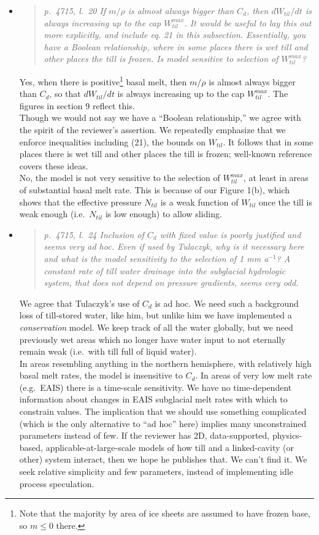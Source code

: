 \documentclass[11pt,reqno]{amsart}
\newcommand{\reply}[2]{
\medskip\medskip
\item  \begin{quote}
\emph{#1}
\end{quote}

\medskip
\noindent #2}
\begin{document}
\begin{itemize}
\reply{p.~4715, l.~20 If $m/\rho$ is almost always bigger than $C_d$, then $dW_{til}/dt$ is always increasing up to the cap $W_{til}^{max}$. It would be useful to lay this out more explicitly, and include eq. 21 in this subsection. Essentially, you have a Boolean relationship, where in some places there is wet till and other places the till is frozen. Is model sensitive to selection of $W_{til}^{max}$?}
{Yes, when there is positive\footnote{Note that the majority by area of ice sheets are assumed to have frozen base, so $m\le 0$ there.} basal melt, then $m/\rho$ is almost always bigger than $C_d$, so that $dW_{til}/dt$ is always increasing up to the cap $W_{til}^{max}$.  The figures in section 9 reflect this. \\
\indent Though we would not say we have a ``Boolean relationship,'' we agree with the spirit of the reviewer's assertion.  We repeatedly emphasize that we enforce inequalities including (21), the bounds on $W_{til}$.  It follows that in some places there is wet till and other places the till is frozen; well-known reference \cite{BBssasliding} covers these ideas.\\
\indent No, the model is not very sensitive to the selection of $W_{til}^{max}$, at least in areas of substantial basal melt rate.  This is because of our Figure 1(b), which shows that the effective pressure $N_{til}$ is a weak function of $W_{til}$ once the till is weak enough (i.e.~$N_{til}$ is low enough) to allow sliding.}

\reply{p.~4715, l.~24 Inclusion of $C_d$ with fixed value is poorly justified and seems very ad hoc.  Even if used by Tulaczyk, why is it necessary here and what is the model sensitivity to the selection of 1 mm a$^{-1}$?  A constant rate of till water drainage into the subglacial hydrologic system, that does not depend on pressure gradients, seems very odd.}
{We agree that Tulaczyk's use of $C_d$ is ad hoc.  We need such a background loss of till-stored water, like him, but unlike him we have implemented a \emph{conservation} model.  We keep track of all the water globally, but we need previously wet areas which no longer have water input to not eternally remain weak (i.e.~with till full of liquid water).\\
\indent In areas resembling anything in the northern hemisphere, with relatively high basal melt rates, the model is insensitive to $C_d$.  In areas of very low melt rate (e.g.~EAIS) there is a time-scale sensitivity.  We have no time-dependent information about changes in EAIS subglacial melt rates with which to constrain values.  The implication that we should use something complicated (which is the only alternative to ``ad hoc'' here) implies many unconstrained parameters instead of few.   If the reviewer has 2D, data-supported, physics-based, applicable-at-large-scale models of how till and a linked-cavity (or other) system interact, then we hope he publishes that.  We can't find it.  We seek relative simplicity and few parameters, instead of implementing idle process speculation.}


\end{itemize}
\end{document}
